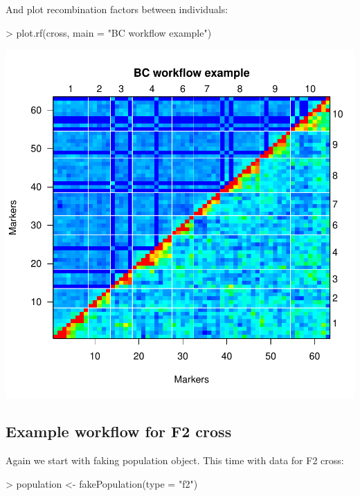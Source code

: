\documentclass{article}
\begin{document}
{\noindent}And plot recombination factors between individuals:
\begin{Schunk}
\begin{Sinput}
> plot.rf(cross, main = "BC workflow example")
\end{Sinput}
\end{Schunk}
\includegraphics{manual-019}

\newpage
\subsection{Example workflow for F2 cross}
{\noindent}Again we start with faking population object. This time with data for F2 cross:
\begin{Schunk}
\begin{Sinput}
> population <- fakePopulation(type = "f2")
\end{Sinput}
\end{Schunk}
\end{document}
